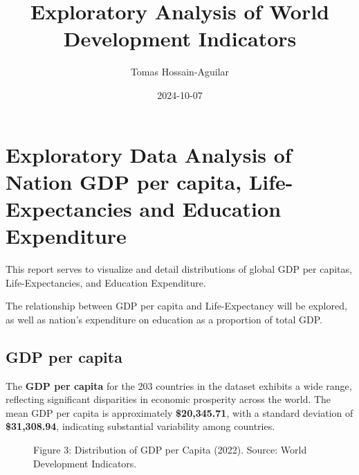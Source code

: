 \documentclass[
]{article}
\title{Exploratory Analysis of World Development Indicators}
\author{Tomas Hossain-Aguilar}
\date{2024-10-07}
\renewcommand*\contentsname{Table of contents}
\newcommand\contentsname{Table of contents}
\begin{document}
\maketitle

\renewcommand*\contentsname{Table of contents}
{
\hypersetup{linkcolor=}
\setcounter{tocdepth}{3}
\tableofcontents
}

\section{Exploratory Data Analysis of Nation GDP per capita,
Life-Expectancies and Education
Expenditure}\label{exploratory-data-analysis-of-nation-gdp-per-capita-life-expectancies-and-education-expenditure}

This report serves to visualize and detail distributions of global GDP
per capitas, Life-Expectancies, and Education Expenditure.

The relationship between GDP per capita and Life-Expectancy will be
explored, as well as nation's expenditure on education as a proportion
of total GDP.

\subsection{GDP per capita}\label{gdp-per-capita}

The \textbf{GDP per capita} for the 203 countries in the dataset
exhibits a wide range, reflecting significant disparities in economic
prosperity across the world. The mean GDP per capita is approximately
\textbf{\$20,345.71}, with a standard deviation of \textbf{\$31,308.94},
indicating substantial variability among countries.

\begin{figure}


\caption{\label{fig-gdp-histogram}Figure 3: Distribution of GDP per
Capita (2022). Source: World Development Indicators.}

\end{figure}%
\end{document}
